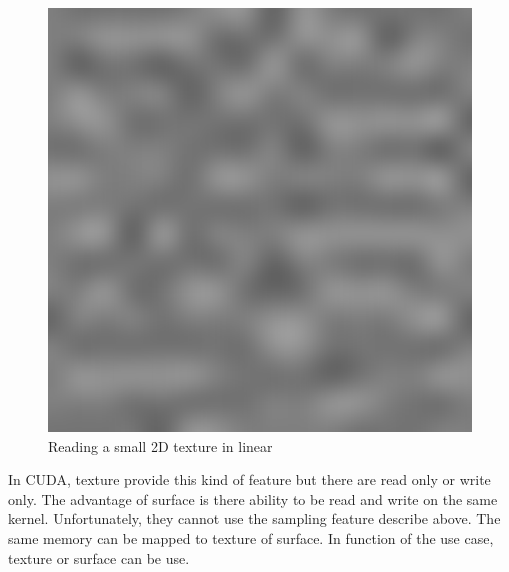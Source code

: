 \documentclass{article}
\begin{document}
\begin{figure}[H]
	\centering
	\includegraphics[scale=0.4]{figures/bilinear.png}
	\caption{Reading a small 2D texture in linear}
\end{figure}

In CUDA, texture provide this kind of feature but there are read only or write only. The advantage of surface is there ability to be read and write on the same kernel. Unfortunately, they cannot use the sampling feature describe above. The same memory can be mapped to texture of surface. In function of the use case, texture or surface can be use.
\end{document}
